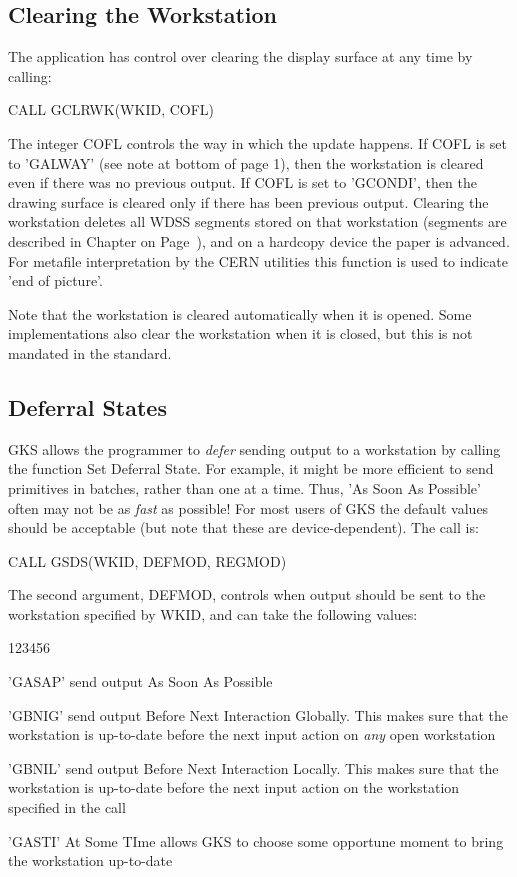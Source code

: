 \subsection{Clearing the Workstation}
 
The application has control over clearing the display
surface at any time by calling:
\begin{XMP}
CALL GCLRWK(WKID, COFL)
\end{XMP}
The integer COFL controls the way in which the update happens.
If COFL is set to 'GALWAY' (see note at bottom of page 1),
then the workstation is cleared even if there was no previous output.
If COFL is set to 'GCONDI', then the drawing surface is cleared only
if there has been previous output.
Clearing the workstation deletes all WDSS segments stored on that
workstation (segments are described in Chapter on Page~\pageref{sec:seghdr}),
and on a hardcopy device the paper is advanced.
For metafile interpretation by the CERN utilities this
function is used to indicate 'end of picture'.
 
Note that the workstation is cleared automatically when
it is opened. Some implementations also clear the workstation when it is
closed, but this is not mandated in the standard.
\subsection{\protect\label{sec:defsta}Deferral States}
 
GKS allows the programmer to {\it defer} sending output to a
workstation by calling the function Set Deferral State.
For example, it might be more efficient to send
primitives in batches, rather than one at a time.
Thus, 'As Soon As Possible' often may not be as {\it fast} as possible!
For most users of GKS the default values should be
acceptable (but note that these are device-dependent).
The call is:
\begin{XMP}
CALL GSDS(WKID, DEFMOD, REGMOD)
\end{XMP}
 
The second argument, DEFMOD, controls when output should be sent to
the workstation specified by WKID, and can take the following values:
\begin{DLtt}{123456}
\item['GASAP']
send output As Soon As Possible
\item['GBNIG']
send output Before Next Interaction Globally. This makes sure
that the workstation is up-to-date before the next input action
on {\it any} open workstation
\item['GBNIL']
send output Before Next Interaction Locally. This makes sure
that the workstation is up-to-date before the next input action
on the workstation specified in the call
\item['GASTI']
At Some TIme allows GKS to choose some opportune moment to
bring the workstation up-to-date
\end{DLtt}
 
